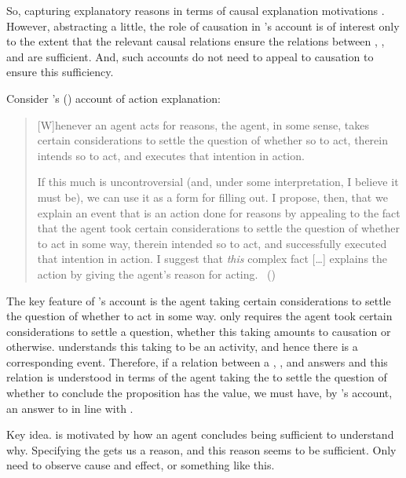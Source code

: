 \begin{note}
  So, capturing explanatory reasons in terms of causal explanation motivations \issueInclusion{}.
  However, abstracting a little, the role of causation in \citeauthor{Davidson:1963aa}'s account is of interest only to the extent that the relevant causal relations ensure the relations between , , and  are sufficient.
  And, such accounts do not need to appeal to causation to ensure this sufficiency.

  Consider \citeauthor{Hieronymi:2011aa}'s (\citeyear{Hieronymi:2011aa}) account of action explanation:

  \begin{quote}
    [W]henever an agent acts for reasons, the agent, in some sense, takes certain considerations to settle the question of whether so to act, therein intends so to act, and executes that intention in action.

    If this much is uncontroversial (and, under some interpretation, I believe it must be), we can use it as a form for filling out.
    I propose, then, that we explain an event that is an action done for reasons by appealing to the fact that the agent took certain considerations to settle the question of whether to act in some way, therein intended so to act, and successfully executed that intention in action.
    I suggest that \emph{this} complex fact [\dots] explains the action by giving the agent's reason for acting.%
    \mbox{ }\hfill\mbox{(\citeyear[421]{Hieronymi:2011aa})}
  \end{quote}

  The key feature of \citeauthor{Hieronymi:2011aa}'s account is the agent taking certain considerations to settle the question of whether to act in some way.
  \citeauthor{Hieronymi:2011aa} only requires the agent took certain considerations to settle a question, whether this taking amounts to causation or otherwise.
  \citeauthor{Hieronymi:2011aa} understands this taking to be an activity, and hence there is a corresponding event.
  Therefore, if a relation between a , , and \pool{} answers \qWhy{} and this relation is understood in terms of the agent taking the \pool{} to settle the question of whether to conclude the proposition has the value, we must have, by \citeauthor{Hieronymi:2011aa}'s account, an answer to \qHow{} in line with \issueInclusion{}.
\end{note}

\begin{note}
  Key idea.
  \issueInclusion{} is motivated by how an agent concludes being sufficient to understand why.
  Specifying the \pool{} gets us a reason, and this reason seems to be sufficient.
  Only need to observe cause and effect, or something like this.
\end{note}


